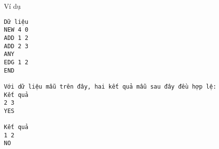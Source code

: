 Ví dụ
\begin{verbatim}
Dữ liệu
NEW 4 0
ADD 1 2
ADD 2 3
ANY
EDG 1 2
END

Với dữ liệu mẫu trên đây, hai kết quả mẫu sau đây đều hợp lệ:
Kết quả
2 3
YES

Kết quả
1 2
NO
\end{verbatim}